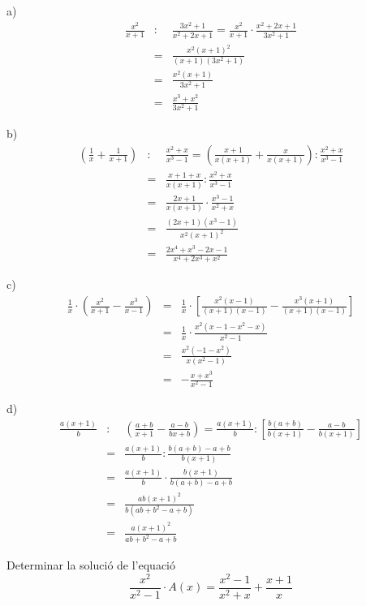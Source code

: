 \begin{solucio}
a)\begin{eqnarray*}
\frac{x^{2}}{x+1} &:&\frac{3x^{2}+1}{x^{2}+2x+1}=\frac{x^{2}}{x+1}\cdot
\frac{x^{2}+2x+1}{3x^{2}+1} \\
&=&\frac{x^{2}(x+1)^{2}}{(x+1)(3x^{2}+1)} \\
&=&\frac{x^{2}(x+1)}{3x^{2}+1} \\
&=&\frac{x^{3}+x^{2}}{3x^{2}+1}
\end{eqnarray*}

b)\begin{eqnarray*}
\left( \frac{1}{x}+\frac{1}{x+1}\right) &:&\frac{x^{2}+x}{x^{3}-1}=\left(
\frac{x+1}{x(x+1)}+\frac{x}{x(x+1)}\right):\frac{x^{2}+x}{x^{3}-1} \\
&=&\frac{x+1+x}{x(x+1)}:\frac{x^{2}+x}{x^{3}-1} \\
&=&\frac{2x+1}{x(x+1)}\cdot \frac{x^{3}-1}{x^{2}+x} \\
&=&\frac{(2x+1)(x^{3}-1)}{x^{2}(x+1)^{2}} \\
&=&\frac{2x^{4}+x^{3}-2x-1}{x^{4}+2x^{3}+x^{2}}
\end{eqnarray*}

c)\begin{eqnarray*}
\frac{1}{x}\cdot \left( \frac{x^{2}}{x+1}-\frac{x^{3}}{x-1}\right) &=&\frac{1}{x}\cdot \left[ \frac{x^{2}(x-1)}{(x+1)(x-1)}-\frac{x^{3}(x+1)}{(x+1)(x-1)}\right] \\
&=&\frac{1}{x}\cdot \frac{x^{2}(x-1-x^{2}-x)}{x^{2}-1} \\
&=&\frac{x^{2}(-1-x^{2})}{x(x^{2}-1)} \\
&=&-\frac{x+x^{3}}{x^{2}-1}
\end{eqnarray*}

d)\begin{eqnarray*}
\frac{a(x+1)}{b} &:&\left( \frac{a+b}{x+1}-\frac{a-b}{bx+b}\right) =\frac{a(x+1)}{b}:\left[ \frac{b(a+b)}{b(x+1)}-\frac{a-b}{b(x+1)}\right] \\
&=&\frac{a(x+1)}{b}:\frac{b(a+b)-a+b}{b(x+1)} \\
&=&\frac{a(x+1)}{b}\cdot \frac{b(x+1)}{b(a+b)-a+b} \\
&=&\frac{ab(x+1)^{2}}{b(ab+b^{2}-a+b)} \\
&=&\frac{a(x+1)^{2}}{ab+b^{2}-a+b}
\end{eqnarray*}
\end{solucio}

\begin{exercici}
Determinar la solució de l'equació\[
\frac{x^{2}}{x^{2}-1}\cdot A(x)=\frac{x^{2}-1}{x^{2}+x}+\frac{x+1}{x}
\]
\end{exercici}

